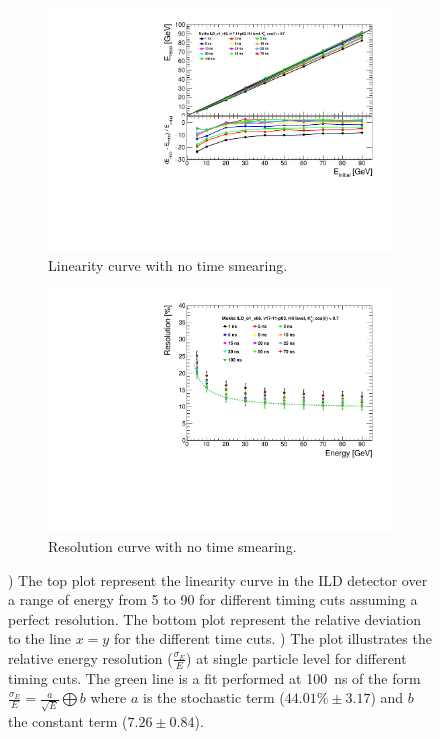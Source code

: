 \begin{figure}[htbp!]
  \centering
  \begin{subfigure}[t]{0.48\textwidth}
    \centering
    \includegraphics[width=1\linewidth]{../Thesis_Plots/ILD/NoSmearing/Plots/Linearity_TimeCuts_noSmearing}
    \caption{Linearity curve with no time smearing.} \label{fig:linearityNoSmearing}
  \end{subfigure}
  \hfill
  \begin{subfigure}[t]{0.48\textwidth}
    \centering
    \includegraphics[width=1\linewidth]{../Thesis_Plots/ILD/NoSmearing/Plots/ShowerResoAbsolute_TimeCuts_noSmearing}
    \caption{Resolution curve with no time smearing.} \label{fig:resoNoSmearing}
  \end{subfigure}
  \caption{) The top plot represent the linearity curve in the ILD detector over a range of energy from 5 \GeV to 90 \GeV for different timing cuts assuming a perfect resolution. The bottom plot represent the relative deviation to the line $x=y$ for the different time cuts. ) The plot illustrates the relative energy resolution ($\frac{\sigma_{E}}{E}$) at single particle level for different timing cuts. The green line is a fit performed at \SI{100}{\nano\second} of the form $\frac{\sigma_{E}}{E} = \frac{a}{\sqrt{E}} \bigoplus b$ where $a$ is the stochastic term ($44.01\% \pm 3.17$) and $b$ the constant term ($7.26 \pm 0.84$).}
\end{figure}

